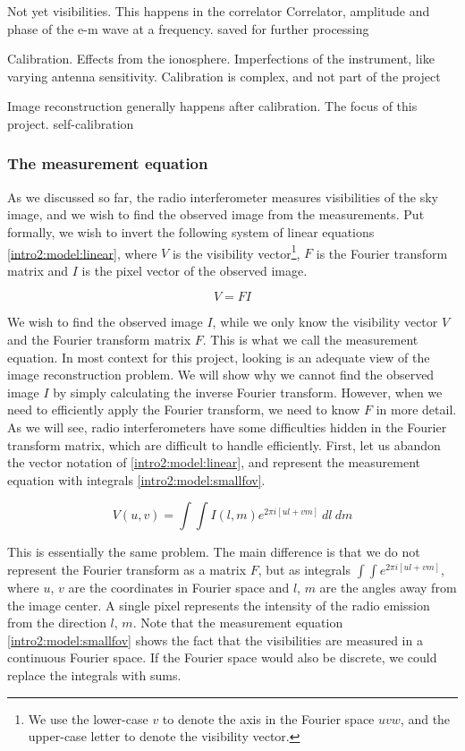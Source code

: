 Not yet visibilities. This happens in the correlator
Correlator, amplitude and phase of the e-m wave at a frequency.
saved for further processing


Calibration. Effects from the ionosphere. Imperfections of the instrument, like varying antenna sensitivity.
Calibration is complex, and not part of the project

Image reconstruction generally happens after calibration. The focus of this project.
self-calibration

\subsubsection{The measurement equation}
As we discussed so far, the radio interferometer measures visibilities of the sky image, and we wish to find the observed image from the measurements. Put formally, we wish to invert the following system of linear equations \eqref{intro2:model:linear}, where $V$ is the visibility vector\footnote{We use the lower-case $v$ to denote the axis in the Fourier space $uvw$, and the upper-case letter to denote the visibility vector.}, $F$ is the Fourier transform matrix and $I$ is the pixel vector of the observed image.

\begin{equation}\label{intro2:model:linear}
V = F I
\end{equation}

We wish to find the observed image $I$, while we only know the visibility vector $V$ and the Fourier transform matrix $F$. This is what we call the measurement equation. In most context for this project, looking is an adequate view of the image reconstruction problem. We will show why we cannot find the observed image $I$ by simply calculating the inverse Fourier transform. However, when we need to efficiently apply the Fourier transform, we need to know $F$ in more detail. As we will see, radio interferometers have some difficulties hidden in the Fourier transform matrix, which are difficult to handle efficiently. First, let us abandon the vector notation of \eqref{intro2:model:linear}, and represent the measurement equation with integrals \eqref{intro2:model:smallfov}.

\begin{equation}\label{intro2:model:smallfov}
V(u, v) = \int\int I(l, m)  e^{2 \pi i [ul+vm]} \: dl \: dm
\end{equation}

This is essentially the same problem. The main difference is that we do not represent the Fourier transform as a matrix $F$, but as integrals $\int\int e^{2 \pi i [ul+vm]}$, where $u$, $v$ are the coordinates in Fourier space and $l$, $m$ are the angles away from the image center. A single pixel represents the intensity of the radio emission from the direction $l$, $m$. Note that the measurement equation \eqref{intro2:model:smallfov} shows the fact that the visibilities are measured in a continuous Fourier space. If the Fourier space would also be discrete, we could replace the integrals with sums.

